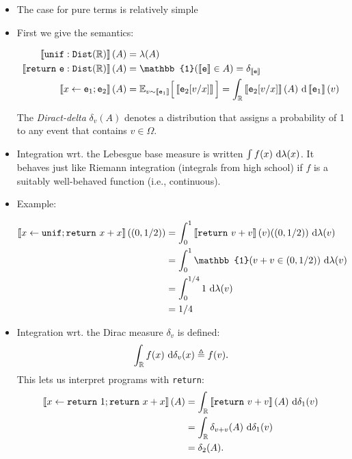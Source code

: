 \documentclass{tufte-handout}
\begin{document}
\begin{itemize}
  \item The case for pure terms is relatively simple
  \item {}
  First we give the semantics:
  \begin{fullwidth}
  \begin{align*}
    \dbracket{\texttt{unif} : \dist{\real}}(A) &= \lambda(A) \\
    \dbracket{\texttt{return}~\te : \dist{\real}}(A) &= \mathbb{1}(\dbracket{\te} \in A) = \delta_{\dbracket{\te}}\\
    \dbracket{x \leftarrow \te_1; \te_2}(A) &= \E_{v \sim \dbracket{\te_1}} \Big[\dbracket{\te_2[v/x]}\Big] = \int_\real \dbracket{\te_2[v/x]}(A) ~\rmd \dbracket{\te_1}(v)
  \end{align*}
\end{fullwidth}
The \emph{Diract-delta} $\delta_v(A)$ denotes a distribution that assigns a
probability of 1 to any event that contains $v \in \Omega$.
  \item Integration wrt. the Lebesgue base measure is written 
  $\int f(x) ~ \mathrm{d} \lambda(x)$. It behaves just like Riemann integration (integrals from 
  high school) if $f$ is a suitably well-behaved function (i.e., continuous). 
  \item Example:
\begin{fullwidth}
  \begin{align*}
    \dbracket{x \leftarrow \texttt{unif}; \texttt{return}~x+x}((0, 1/2)) &= 
    \int_0^1 \dbracket{\texttt{return}~v + v}(v)((0, 1/2)) ~ \rmd \lambda(v) \\
    &= \int_0^1 \mathbb{1}(v + v \in (0, 1/2)) ~ \rmd \lambda(v) \\
    &= \int_0^{1/4} 1~\rmd \lambda(v) \\
    &= 1/4
  \end{align*}
\end{fullwidth}
\item Integration wrt. the Dirac measure $\delta_v$ is defined: 
\begin{align}
  \int_{\mathbb{R}} f(x) ~ \mathrm{d} \delta_v(x) \triangleq f(v).
\end{align}
This lets us interpret programs with \texttt{return}:
\begin{align*}
  \left \llbracket {x \leftarrow \texttt{return}~1; \texttt{return}~x+x} \right \rrbracket(A) &= 
  \int_{\mathbb{R}} \left \llbracket {\texttt{return}~v+v} \right \rrbracket(A)~\mathrm{d} \delta_1(v) \\ 
  &= \int_{\mathbb{R}} \delta_{v+v}(A)~\mathrm{d} \delta_1(v) \\
  &= \delta_{2}(A).
\end{align*}
\end{itemize}
\end{document}
